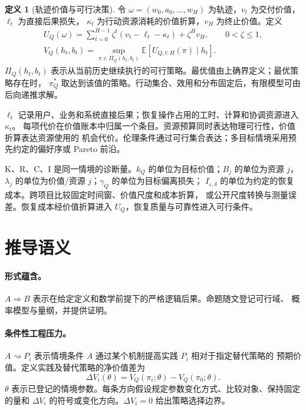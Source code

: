 \documentclass[11pt,a4paper]{ctexart}
\numberwithin{equation}{section}
\theoremstyle{definition}
\newtheorem{definition}{定义}[section]
\theoremstyle{plain}
\begin{document}
\begin{definition}[轨迹价值与可行决策]
令 $\omega=(w_0,a_0,\ldots,w_H)$ 为轨迹，$v_t$ 为交付价值，$\ell_t$ 为直接后果损失，
$\kappa_t$ 为行动资源消耗的价值折算，$v_H$ 为终止价值。定义
\begin{align}
U_Q(\omega)=\sum_{t=0}^{H-1}\zeta^t(v_t-\ell_t-\kappa_t)+\zeta^H v_H,
\qquad 0<\zeta\le1, \label{eq:trajectory-value}\\
V_Q(h_t,b_t)=\sup_{\pi\in\Pi_Q(h_t,b_t)}
\mathbb E[U_{Q,t:H}(\pi)\mid h_t]. \label{eq:value-function}
\end{align}
$\Pi_Q(h_t,b_t)$ 表示从当前历史继续执行的可行策略。最优值由上确界定义；最优策略存在时，
$\pi_Q^*$ 取达到该值的策略。行动集合、效用和分布固定后，有限模型可由后向递推求解。
\end{definition}

$\ell_t$ 记录用户、业务和系统直接后果；恢复操作占用的工时、计算和协调资源进入 $\kappa_t$。
每项代价在价值账本中归属一个条目。资源预算同时表达物理可行性，价值折算表达资源使用的
机会代价。伦理条件通过可行集合表达；多目标情境采用预先约定的偏好序或 Pareto 前沿。

K、R、C、I 是同一情境的诊断量。$k_Q$ 的单位为目标价值；$B_j$ 的单位为资源 $j$，
$\lambda_j$ 的单位为价值/资源 $j$；$\gamma_Q$ 的单位为目标偏离损失；
$I_{\varepsilon,\delta}$ 的单位为约定的恢复成本。跨项目比较固定时间窗、价值尺度和成本折算，
或公开尺度转换与测量误差。恢复成本经价值折算进入 $U_Q$，恢复质量与可靠性进入可行条件。

\section{推导语义}

\paragraph{形式蕴含。}
$A\Longrightarrow B$ 表示在给定定义和数学前提下的严格逻辑后果。命题随文登记可行域、
概率模型与量纲，并提供证明。

\paragraph{条件性工程压力。}
$A\rightsquigarrow P_i$ 表示情境条件 $A$ 通过某个机制提高实践 $P_i$ 相对于指定替代策略的
预期价值。定义实践及替代策略的净价值差为
\[
\Delta V_i(\theta)=V_Q(\pi_i;\theta)-V_Q(\pi_0;\theta).
\]
$\theta$ 表示已登记的情境参数。每条方向假设规定参数变化方式、比较对象、保持固定的量和
$\Delta V_i$ 的符号或变化方向。$\Delta V_i=0$ 给出策略选择边界。
\end{document}
